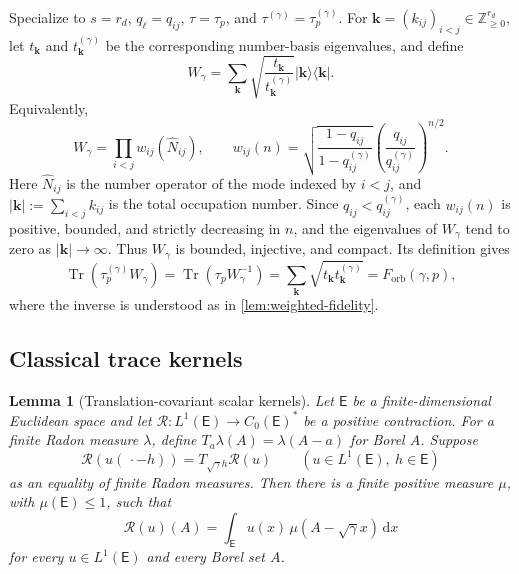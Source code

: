 \documentclass[11pt]{article}
\newtheorem{lemma}[lemma]{Lemma}
\theoremstyle{remark}
\theoremstyle{plain}
\newcommand{\dd}{\mathrm d}
\newcommand{\Tr}{\operatorname{Tr}}
\newcommand{\proj}[1]{|#1\rangle\!\langle #1|}
\newcommand{\Forb}{F_{\mathrm{orb}}}
\begin{document}
Specialize to \(s=r_d\), \(q_\ell=q_{ij}\),
\(\tau=\tau_p\), and \(\tau^{(\gamma)}=\tau_p^{(\gamma)}\).
For
\(\mathbf k=(k_{ij})_{i<j}\in\mathbb Z_{\ge0}^{r_d}\), let
\(t_{\mathbf k}\) and \(t_{\mathbf k}^{(\gamma)}\) be the corresponding
number-basis eigenvalues, and define
\begin{equation}\label{eq:quantum-witness}
  W_\gamma
  =\sum_{\mathbf k}
  \sqrt{\frac{t_{\mathbf k}}{t_{\mathbf k}^{(\gamma)}}}
  \proj{\mathbf k}.
\end{equation}
Equivalently,
\[
  W_\gamma=\prod_{i<j}w_{ij}(\widehat N_{ij}),
  \qquad
  w_{ij}(n)=
  \sqrt{\frac{1-q_{ij}}{1-q_{ij}^{(\gamma)}}}
  \left(\frac{q_{ij}}{q_{ij}^{(\gamma)}}\right)^{n/2}.
\]
Here \(\widehat N_{ij}\) is the number operator of the mode indexed by
\(i<j\), and \(\lvert\mathbf k\rvert:=\sum_{i<j}k_{ij}\) is the total
occupation number.
Since \(q_{ij}<q_{ij}^{(\gamma)}\), each \(w_{ij}(n)\) is positive, bounded,
and strictly decreasing in \(n\), and the eigenvalues of \(W_\gamma\) tend
to zero as \(\lvert\mathbf k\rvert\to\infty\).
Thus \(W_\gamma\) is bounded,
injective, and compact.  Its definition gives
\begin{equation}\label{eq:quantum-witness-identities}
  \Tr(\tau_p^{(\gamma)}W_\gamma)
  =\Tr(\tau_p W_\gamma^{-1})
  =\sum_{\mathbf k}\sqrt{t_{\mathbf k}t_{\mathbf k}^{(\gamma)}}
  =\Forb(\gamma,p),
\end{equation}
where the inverse is understood as in \cref{lem:weighted-fidelity}.

\subsection{Classical trace kernels}

\begin{lemma}[Translation-covariant scalar kernels]
\label{lem:scalar-convolution}
Let \(\mathsf E\) be a finite-dimensional Euclidean space and let
\(\mathcal R:L^1(\mathsf E)\to C_0(\mathsf E)^*\) be a positive
contraction.  For a finite Radon measure \(\lambda\), define
\(T_a\lambda(A)=\lambda(A-a)\) for Borel \(A\).  Suppose
\begin{equation}\label{eq:scalar-measure-covariance}
  \mathcal R(u(\,\cdot-h))=T_{\sqrt\gamma h}\mathcal R(u)
  \qquad(u\in L^1(\mathsf E),\ h\in\mathsf E)
\end{equation}
as an equality of finite Radon measures.  Then there is a finite positive
measure \(\mu\), with \(\mu(\mathsf E)\le1\), such that
\begin{equation}\label{eq:scalar-convolution}
  \mathcal R(u)(A)
  =\int_{\mathsf E}u(x)\,\mu(A-\sqrt\gamma x)\,\dd x
\end{equation}
for every \(u\in L^1(\mathsf E)\) and every Borel set \(A\).
\end{lemma}
\end{document}
